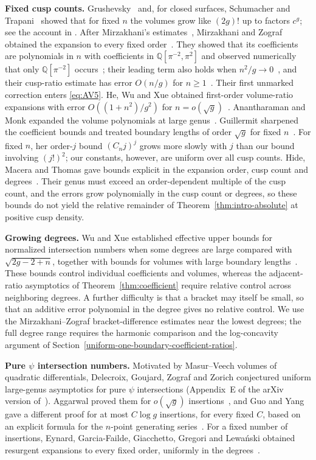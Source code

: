 \textbf{Fixed cusp counts.}
Grushevsky~\cite{Gru} and, for closed surfaces, Schumacher and
Trapani~\cite{ST} showed that for fixed $n$ the volumes grow like
$(2g)!$ up to factors $c^g$; see the account in \cite[Section~1.4]{Mir}.
After Mirzakhani's estimates~\cite{Mir}, Mirzakhani and Zograf obtained
the expansion to every fixed order~\cite[Theorem~1.2]{MZ}. They showed that its coefficients
are polynomials in $n$ with coefficients in $\mathbb Q[\pi^{-2},\pi^2]$
and observed numerically that only $\mathbb Q[\pi^{-2}]$
occurs~\cite[Theorem~1.2 and Remark~1.3]{MZ}; their leading term also
holds when $n^2/g\to0$~\cite[Theorem~1.8]{MZ}, and their cusp-ratio
estimate has error $O(n/g)$ for $n\ge1$~\cite[Lemma~5.1]{MZ}. Their
first unmarked correction enters \eqref{eq:AV5}. He, Wu and Xue obtained
first-order volume-ratio expansions with error $O((1+n^2)/g^2)$ for
$n=o(\sqrt g)$~\cite[Theorem~4.11]{HWX}. Anantharaman and Monk expanded
the volume polynomials at large genus~\cite{AM}. Guillermit sharpened
the coefficient bounds and treated boundary lengths of order $\sqrt g$
for fixed $n$~\cite[Theorems~2, 4, 5 and Remark~3]{Guillermit}. For
fixed $n$, her order-$j$ bound $(C_nj)^j$ grows more slowly with $j$
than our bound involving $(j!)^2$; our constants, however, are uniform
over all cusp counts. Hide, Macera and Thomas gave bounds explicit in
the expansion order, cusp count and degrees~\cite[Theorem~4.2,
A1--A4]{HMT}. Their genus must exceed an order-dependent multiple of the
cusp count, and the errors grow polynomially in the cusp count or
degrees, so these bounds do not yield the relative remainder of
Theorem~\ref{thm:intro-absolute} at positive cusp density.

\textbf{Growing degrees.}
Wu and Xue established effective upper bounds for normalized
intersection numbers when some degrees are large compared with
$\sqrt{2g-2+n}$, together with bounds for volumes with large boundary
lengths~\cite{WXPrime}. These bounds control individual coefficients
and volumes, whereas the adjacent-ratio asymptotics of
Theorem~\ref{thm:coefficient} require relative control across
neighboring degrees. A further difficulty is that a bracket may itself
be small, so that an additive error polynomial in the degree gives no
relative control. We use the Mirzakhani--Zograf bracket-difference
estimates near the lowest degrees; the full degree range requires the
harmonic comparison and the log-concavity argument of
Section~\ref{uniform-one-boundary-coefficient-ratios}.

\textbf{Pure $\psi$ intersection numbers.}
Motivated by Masur--Veech volumes of quadratic differentials,
Delecroix, Goujard, Zograf and Zorich conjectured uniform large-genus asymptotics for pure $\psi$ intersections (Appendix~E of the arXiv version of~\cite{DGZZ}). Aggarwal proved them for $o(\sqrt g)$ insertions~\cite{Agg}, and Guo and Yang gave a different proof for at most $C\log g$ insertions, for every fixed $C$, based on an explicit formula for the $n$-point generating series~\cite[Theorem~1]{GY}. For a fixed number of insertions, Eynard, Garcia-Failde, Giacchetto, Gregori and Lewa\'nski obtained resurgent expansions to every fixed order, uniformly in the degrees~\cite[Theorem~3.13]{EGGGL}.

